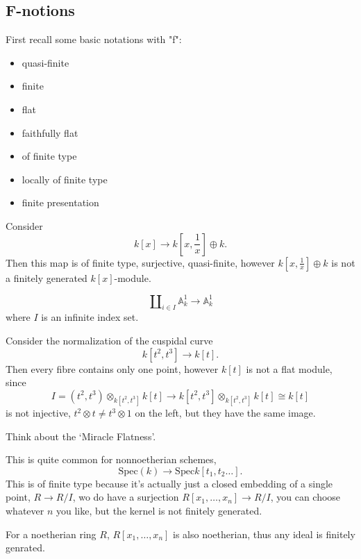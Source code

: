 \documentclass[../main.tex]{subfiles}
\begin{document}
\subsection{F-notions}
First recall some basic notations with "f":
\begin{itemize}
\item quasi-finite
\item finite
\item flat
\item faithfully flat
\item of finite type
\item locally of finite type
\item finite presentation
\end{itemize}
\begin{example}
Consider
$$k[x]\rightarrow k[x,\frac{1}{x}]\oplus k.$$
Then this map is of finite type, surjective, quasi-finite, however $k[x,\frac{1}{x}]\oplus k$ is not a finitely generated $k[x]$-module.
\end{example}
\begin{example}
$$\amalg_{i\in I}\mathbb{A}_{k}^{1}\rightarrow \mathbb{A}_{k}^{1}$$
where $I$ is an infinite index set.
\end{example}
\begin{example}
Consider the normalization of the cuspidal curve
$$k[t^{2},t^{3}]\rightarrow k[t].$$
Then every fibre contains only one point, however $k[t]$ is not a flat module, since
$$I=(t^{2},t^{3})\otimes_{k[t^{2},t^{3}]} k[t]\rightarrow k[t^{2},t^{3}]\otimes_{k[t^{2},t^{3}]}k[t]\cong k[t]$$
is not injective, $t^{2}\otimes t\neq t^{3}\otimes 1$ on the left, but they have the same image.
\end{example}
\begin{remark}
Think about the `Miracle Flatness'.
\end{remark}
\begin{example}
This is quite common for nonnoetherian schemes, 
$$\mathrm{Spec}(k)\rightarrow \mathrm{Spec}k[t_{1}, t_{2}\dots].$$
This is of finite type because it's actually just a closed embedding of a single point, $R\rightarrow R/I$, wo do have a surjection $R[x_{1},\dots, x_{n}]\rightarrow R/I$, you can choose whatever $n$ you like, but the kernel is not finitely generated.
\end{example}
\begin{remark}
For a noetherian ring $R$, $R[x_{1},\dots, x_{n}]$ is also noetherian, thus any ideal is finitely genrated. 
\end{remark}
\end{document}
